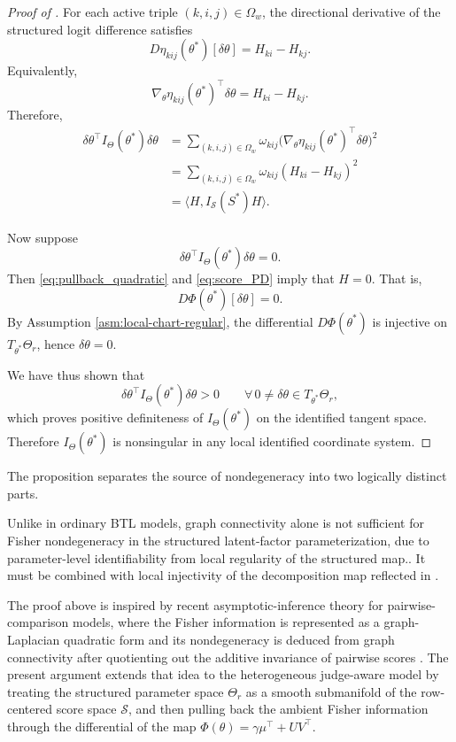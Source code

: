 \documentclass{article}
\begin{document}
\begin{bibunit}[unsrtnat]
\begin{proof}[Proof of ]
For each active triple \((k,i,j)\in\Omega_w\), the directional derivative of the structured logit difference satisfies
\[
D\eta_{kij}(\theta^*)[\delta\theta]
=
H_{ki}-H_{kj}.
\]
Equivalently,
\[
\nabla_\theta \eta_{kij}(\theta^*)^\top \delta\theta
=
H_{ki}-H_{kj}.
\]
Therefore,
\begin{align}
\delta\theta^\top I_\Theta(\theta^*)\delta\theta
&=
\sum_{(k,i,j)\in\Omega_w}\omega_{kij}\bigl(\nabla_\theta \eta_{kij}(\theta^*)^\top\delta\theta\bigr)^2\nonumber\\
&=\sum_{(k,i,j)\in\Omega_w}\omega_{kij}(H_{ki}-H_{kj})^2\nonumber\\
&=\langle H, I_{\mathcal S}(S^*)H\rangle.
\label{eq:pullback_quadratic}
\end{align}

Now suppose
\[
\delta\theta^\top I_\Theta(\theta^*)\delta\theta=0.
\]
Then \eqref{eq:pullback_quadratic} and \eqref{eq:score_PD} imply that \(H=0\). That is,
\[
D\Phi(\theta^*)[\delta\theta]=0.
\]
By Assumption \ref{asm:local-chart-regular}, the differential \(D\Phi(\theta^*)\) is injective
on \(T_{\theta^*}\Theta_r\), hence \(\delta\theta=0\).

We have thus shown that
\[
\delta\theta^\top I_\Theta(\theta^*)\delta\theta>0
\qquad
\forall\, 0\neq \delta\theta\in T_{\theta^*}\Theta_r,
\]
which proves positive definiteness of \(I_\Theta(\theta^*)\) on the identified tangent space.
Therefore \(I_\Theta(\theta^*)\) is nonsingular in any local identified coordinate system.
\end{proof}

\begin{remark}
\label{rem:two_layer_argument}
The proposition separates the source of nondegeneracy into two logically distinct parts.

Unlike in ordinary BTL models, graph connectivity alone is not sufficient for Fisher nondegeneracy in the structured latent-factor parameterization, due to parameter-level identifiability from local regularity of the structured map.. It must be combined with local injectivity of the decomposition map reflected in .
\end{remark}

\begin{remark}
\label{rem:relation_pairwise_inference}
The proof above is inspired by recent asymptotic-inference theory for pairwise-comparison models, where the Fisher information is represented as a graph-Laplacian quadratic form and its nondegeneracy is deduced from graph connectivity after quotienting out the additive invariance of pairwise scores \citep{han2025statisticalinferencepairwisecomparison}. The present argument extends that idea to the heterogeneous judge-aware model by treating the structured parameter space \(\Theta_r\) as a smooth submanifold of the row-centered score space \(\mathcal S\), and then pulling back the ambient Fisher information through the differential of the map \(\Phi(\theta)=\gamma\mu^\top+UV^\top\).


\end{remark}
\end{bibunit}
\end{document}
